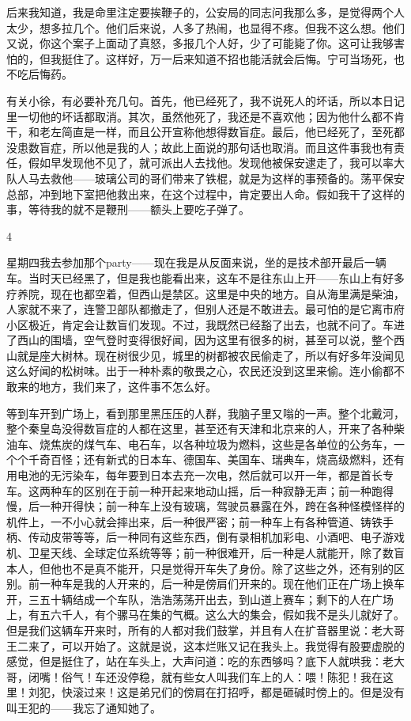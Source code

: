 后来我知道，我是命里注定要挨鞭子的，公安局的同志问我那么多，是觉得两个人太少，想多拉几个。他们后来说，人多了热闹，也显得不疼。但我不这么想。他们又说，你这个案子上面动了真怒，多报几个人好，少了可能毙了你。这可让我够害怕的，但我挺住了。这样好，万一后来知道不招也能活就会后悔。宁可当场死，也不吃后悔药。 

有关小徐，有必要补充几句。首先，他已经死了，我不说死人的坏话，所以本日记里一切他的坏话都取消。其次，虽然他死了，我还是不喜欢他；因为他什么都不肯干，和老左简直是一样，而且公开宣称他想得数盲症。最后，他已经死了，至死都没患数盲症，所以他是我的人；故此上面说的那句话也取消。而且这件事我也有责任，假如早发现他不见了，就可派出人去找他。发现他被保安逮走了，我可以率大队人马去救他——玻璃公司的哥们带来了铁棍，就是为这样的事预备的。荡平保安总部，冲到地下室把他救出来，在这个过程中，肯定要出人命。假如我干了这样的事，等待我的就不是鞭刑——额头上要吃子弹了。 



4 

星期四我去参加那个party——现在我是从反面来说，坐的是技术部开最后一辆车。当时天已经黑了，但是我也能看出来，这车不是往东山上开——东山上有好多疗养院，现在也都空着，但西山是禁区。这里是中央的地方。自从海里满是柴油，人家就不来了，连警卫部队都撤走了，但别人还是不敢进去。最可怕的是它离市府小区极近，肯定会让数盲们发现。不过，我既然已经豁了出去，也就不问了。车进了西山的围墙，空气登时变得很好闻，因为这里有很多的树，甚至可以说，整个西山就是座大树林。现在树很少见，城里的树都被农民偷走了，所以有好多年没闻见这么好闻的松树味。出于一种朴素的敬畏之心，农民还没到这里来偷。连小偷都不敢来的地方，我们来了，这件事不怎么好。 

等到车开到广场上，看到那里黑压压的人群，我脑子里又嗡的一声。整个北戴河，整个秦皇岛没得数盲症的人都在这里，甚至还有天津和北京来的人，开来了各种柴油车、烧焦炭的煤气车、电石车，以各种垃圾为燃料，这些是各单位的公务车，一个个千奇百怪；还有新式的日本车、德国车、美国车、瑞典车，烧高级燃料，还有用电池的无污染车，每年要到日本去充一次电，然后就可以开一年，都是首长专车。这两种车的区别在于前一种开起来地动山摇，后一种寂静无声；前一种跑得慢，后一种开得快；前一种车上没有玻璃，驾驶员暴露在外，跨在各种怪模怪样的机件上，一不小心就会摔出来，后一种很严密；前一种车上有各种管道、铸铁手柄、传动皮带等等，后一种同有这些东西，倒有录相机加彩电、小酒吧、电子游戏机、卫星天线、全球定位系统等等；前一种很难开，后一种是人就能开，除了数盲本人，但他也不是真不能开，只是觉得开车失了身份。除了这些之外，还有别的区别。前一种车是我的人开来的，后一种是傍肩们开来的。现在他们正在广场上换车开，三五十辆结成一个车队，浩浩荡荡开出去，到山道上赛车；剩下的人在广场上，有五六千人，有个骡马在集的气概。这么大的集会，假如我不是头儿就好了。但是我们这辆车开来时，所有的人都对我们鼓掌，并且有人在扩音器里说：老大哥王二来了，可以开始了。这就是说，这本烂账又记在我头上。我觉得有股要虚脱的感觉，但是挺住了，站在车头上，大声问道：吃的东西够吗？底下人就哄我：老大哥，闭嘴！俗气！车还没停稳，就有些女人叫我们车上的人：喂！陈犯！我在这里！刘犯，快滚过来！这是弟兄们的傍肩在打招呼，都是砸碱时傍上的。但是没有叫王犯的——我忘了通知她了。 

